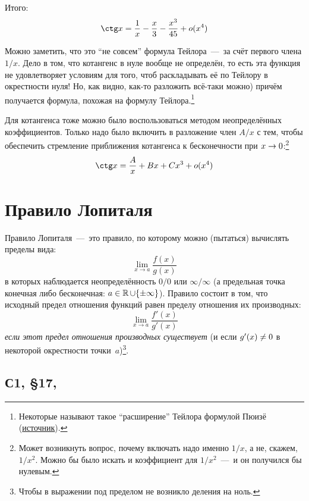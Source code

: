 \documentclass[a4paper,12pt]{article}
\begin{document}
\begin{solution}
    Итого:
    \[
      \ctg x = \frac{1}{x} - \frac{x}{3} - \frac{x^3}{45} + o(x^4)
    \]

    Можно заметить, что это ``не совсем'' формула Тейлора~---~за счёт первого члена $1/x$.
    Дело в том, что котангенс в нуле вообще не определён, то есть эта функция не удовлетворяет условиям для того, чтоб раскладывать её по Тейлору в окрестности нуля!
    Но, как видно, как-то разложить всё-таки можно) причём получается формула, похожая на формулу Тейлора.\footnote{
      Некоторые называют такое ``расширение'' Тейлора формулой Пюизё (\href{https://math.stackexchange.com/questions/637169/taylor-series-for-cot-x\#comment7700747_637169}{источник}).
    }

    Для котангенса тоже можно было воспользоваться методом неопределённых коэффициентов.
    Только надо было включить в разложение член $A/x$ с тем, чтобы обеспечить стремление приближения котангенса к бесконечности при $x \hm\to 0$:\footnote{
      Может возникнуть вопрос, почему включать надо именно $1/x$, а не, скажем, $1/x^2$.
      Можно бы было искать и коэффициент для $1/x^2$~---~и он получился бы нулевым.
    }
    \[
      \ctg x = \frac{A}{x} + B x + C x^3 + o(x^4)
    \]
  \end{solution}
  
  
  
  \section{Правило Лопиталя}
  

  Правило Лопиталя~---~это правило, по которому можно (пытаться) вычислять пределы вида:
  \[
    \lim_{x \to a} \frac{f(x)}{g(x)}
  \]
  в которых наблюдается неопределённость $0/0$ или $\infty/\infty$
  (а предельная точка конечная либо бесконечная: $a \hm\in \RR \hm\cup \{\pm \infty\}$).
  Правило состоит в том, что исходный предел отношения функций равен пределу отношения их производных:
  \[
    \lim_{x \to a} \frac{f'(x)}{g'(x)}
  \]
  \emph{если этот предел отношения производных существует} (и если $g'(x) \hm{\not=} 0$ в некоторой окрестности точки~$a$)\footnote{
    Чтобы в выражении под пределом не возникло деления на ноль.
  }.
  
  
  \subsection{С1, \S 17, }
  
\end{document}

